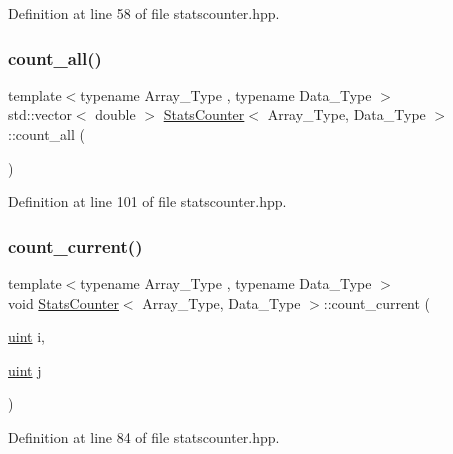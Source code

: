 Definition at line 58 of file statscounter.\+hpp.

\mbox{\label{class_stats_counter_a83bd92031a1499109c98f238221cbd67}} 
\subsubsection{\texorpdfstring{count\+\_\+all()}{count\_all()}}
{\footnotesize\ttfamily template$<$typename Array\+\_\+\+Type , typename Data\+\_\+\+Type $>$ \\
std\+::vector$<$ double $>$ \hyperlink{class_stats_counter}{Stats\+Counter}$<$ Array\+\_\+\+Type, Data\+\_\+\+Type $>$\+::count\+\_\+all (\begin{DoxyParamCaption}{ }\end{DoxyParamCaption})\hspace{0.3cm}{\ttfamily [inline]}}



Definition at line 101 of file statscounter.\+hpp.

\mbox{\label{class_stats_counter_ab81166f7cb67eeaecc469016d237019a}} 
\subsubsection{\texorpdfstring{count\+\_\+current()}{count\_current()}}
{\footnotesize\ttfamily template$<$typename Array\+\_\+\+Type , typename Data\+\_\+\+Type $>$ \\
void \hyperlink{class_stats_counter}{Stats\+Counter}$<$ Array\+\_\+\+Type, Data\+\_\+\+Type $>$\+::count\+\_\+current (\begin{DoxyParamCaption}\item[{\hyperlink{typedefs_8hpp_a91ad9478d81a7aaf2593e8d9c3d06a14}{uint}}]{i,  }\item[{\hyperlink{typedefs_8hpp_a91ad9478d81a7aaf2593e8d9c3d06a14}{uint}}]{j }\end{DoxyParamCaption})\hspace{0.3cm}{\ttfamily [inline]}}



Definition at line 84 of file statscounter.\+hpp.

